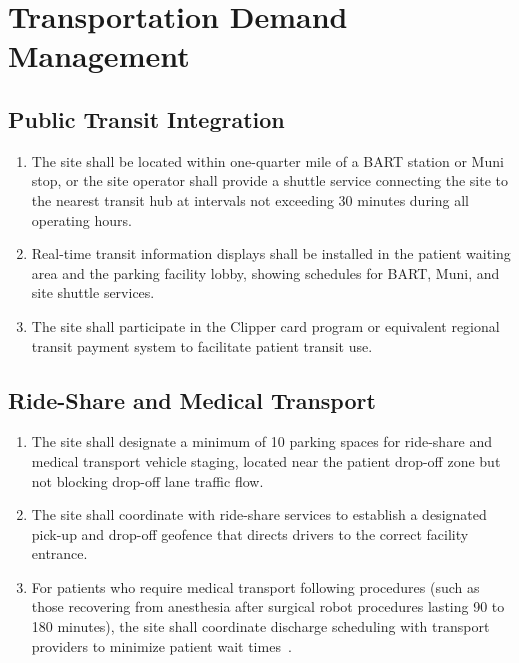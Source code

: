 \section{Transportation Demand Management}

\subsection{Public Transit Integration}

\begin{enumerate}[label=(\alph*)]
\item The site shall be located within one-quarter mile of a BART station or
  Muni stop, or the site operator shall provide a shuttle service connecting
  the site to the nearest transit hub at intervals not exceeding 30 minutes
  during all operating hours.

\item Real-time transit information displays shall be installed in the patient
  waiting area and the parking facility lobby, showing schedules for BART,
  Muni, and site shuttle services.

\item The site shall participate in the Clipper card program or equivalent
  regional transit payment system to facilitate patient transit use.
\end{enumerate}

\subsection{Ride-Share and Medical Transport}

\begin{enumerate}[label=(\alph*)]
\item The site shall designate a minimum of 10 parking spaces for ride-share
  and medical transport vehicle staging, located near the patient drop-off
  zone but not blocking drop-off lane traffic flow.

\item The site shall coordinate with ride-share services to establish a
  designated pick-up and drop-off geofence that directs drivers to the
  correct facility entrance.

\item For patients who require medical transport following procedures (such as
  those recovering from anesthesia after surgical robot procedures lasting
  90 to 180 minutes), the site shall coordinate discharge scheduling with
  transport providers to minimize patient wait
  times~\cite{patientinstructions2026}.
\end{enumerate}

